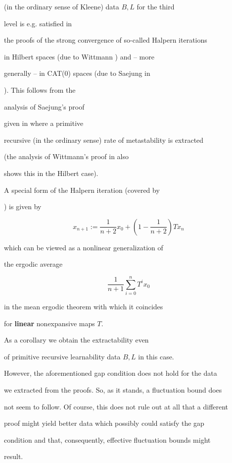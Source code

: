 \documentclass[1p]{elsarticle}
\theoremstyle{plain}
\theoremstyle{definition}
\theoremstyle{remark}
\theoremstyle{definition}
\begin{document}
(in the ordinary sense of Kleene) data $B,L$ for the third 

level is e.g. satisfied in 

the proofs of the strong convergence of so-called Halpern iterations 

in Hilbert spaces (due to Wittmann \cite{Wittmann(92)}) and -- more 

generally --  in CAT(0) spaces (due to Saejung in 

\cite{Saejung}). This follows from the 

analysis of Saejung's proof 

given in \cite{Kohlenbach/Leustean6} where a primitive 

recursive (in the ordinary sense) rate of metastability is extracted

(the analysis of Wittmann's proof in \cite{Kohlenbach(Browder)} also 

shows this in the Hilbert case).  

A special form of the Halpern iteration (covered by 

\cite{Wittmann(92),Saejung}) is given by  

\[ x_{n+1} :=\frac{1}{n+2}x_0+\left(1-\frac{1}{n+2}\right) Tx_n \]

which can be viewed as a nonlinear generalization of 

the ergodic average 

\[ \frac{1}{n+1}\sum^n_{i=0}T^ix_0 \] 

in the mean ergodic theorem with which it coincides 

for {\bf linear} nonexpansive  maps $T.$ 

As a corollary we obtain the extractability even 

of primitive recursive learnability data $B,L$ in this case. 

However, the aforementioned gap condition does not hold for the data 

we extracted from the proofs. So, as it stands, a fluctuation bound does 

not seem to follow. Of course, this does not rule out at all that a different 

proof might yield better data which possibly could satisfy the gap 

condition and that, consequently, effective fluctuation bounds might 

result. 

\\[1mm]  
\end{document}
